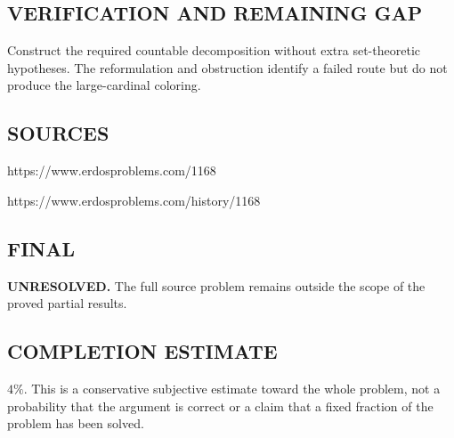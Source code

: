 \subsection*{VERIFICATION AND REMAINING GAP}
Construct the required countable decomposition without extra set-theoretic
hypotheses. The reformulation and obstruction identify a failed route but do
not produce the large-cardinal coloring.

\subsection*{SOURCES}
https://www.erdosproblems.com/1168

https://www.erdosproblems.com/history/1168

\subsection*{FINAL}
\textbf{UNRESOLVED.} The full source problem remains outside the scope of the proved partial results.

\subsection*{COMPLETION ESTIMATE}
$4\%$. This is a conservative subjective estimate toward the whole problem, not a probability that the argument is correct or a claim that a fixed fraction of the problem has been solved.
